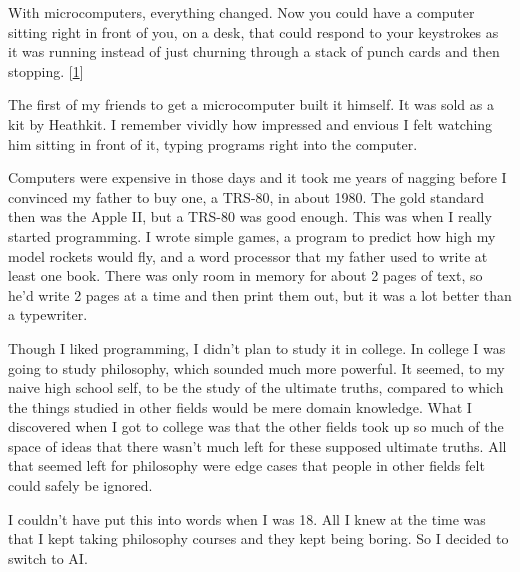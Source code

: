 With
                  microcomputers, everything changed. Now you could have a
                  computer sitting right in front of you, on a desk, that could
                  respond to your keystrokes as it was running instead of just
                  churning through a stack of punch cards and then stopping.
                  [\href{\#f1n}{1}]

The first of my friends to get a microcomputer
                  built it himself. It was sold as a kit by Heathkit. I remember
                  vividly how impressed and envious I felt watching him sitting
                  in front of it, typing programs right into the computer.

Computers
                  were expensive in those days and it took me years of nagging
                  before I convinced my father to buy one, a TRS-80, in about
                  1980. The gold standard then was the Apple II, but a TRS-80
                  was good enough. This was when I really started programming. I
                  wrote simple games, a program to predict how high my model
                  rockets would fly, and a word processor that my father used to
                  write at least one book. There was only room in memory for
                  about 2 pages of text, so he'd write 2 pages at a time and
                  then print them out, but it was a lot better than a
                  typewriter.

Though I liked programming, I didn't
                  plan to study it in college. In college I was going to study
                  philosophy, which sounded much more powerful. It seemed, to my
                  naive high school self, to be the study of the ultimate
                  truths, compared to which the things studied in other fields
                  would be mere domain knowledge. What I discovered when I got
                  to college was that the other fields took up so much of the
                  space of ideas that there wasn't much left for these supposed
                  ultimate truths. All that seemed left for philosophy were edge
                  cases that people in other fields felt could safely be
                  ignored.

I couldn't have put this into words when I
                  was 18. All I knew at the time was that I kept taking
                  philosophy courses and they kept being boring. So I decided to
                  switch to AI.


